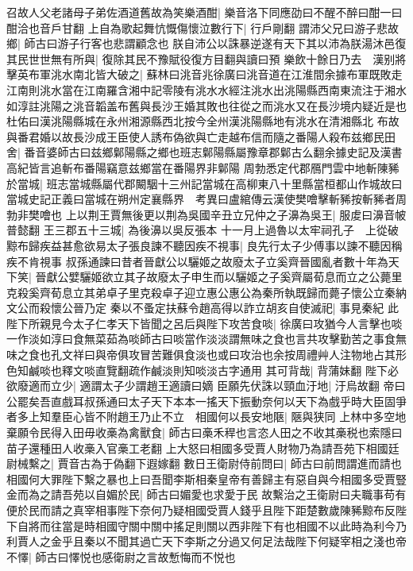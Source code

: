 召故人父老諸母子弟佐酒道舊故為笑樂酒酣|{
	樂音洛下同應劭曰不醒不醉曰酣一曰酣洽也音戶甘翻}
上自為歌起舞忼慨傷懷泣數行下|{
	行戶剛翻}
謂沛父兄曰游子悲故鄉|{
	師古曰游子行客也悲謂顧念也}
朕自沛公以誅暴逆遂有天下其以沛為朕湯沐邑復其民世世無有所與|{
	復除其民不豫賦役復方目翻與讀曰預}
樂飲十餘日乃去　漢别將擊英布軍洮水南北皆大破之|{
	蘇林曰洮音兆徐廣曰洮音道在江淮間余據布軍既敗走江南則洮水當在江南羅含湘中記零陵有洮水水經注洮水出洮陽縣西南東流注于湘水如淳註洮陽之洮音韜盖布舊與長沙王婚其敗也往從之而洮水又在長沙境内疑近是也杜佑曰漢洮陽縣城在永州湘源縣西北按今全州漢洮陽縣地有洮水在清湘縣北}
布故與番君婚以故長沙成王臣使人誘布偽欲與亡走越布信而隨之番陽人殺布兹鄉民田舍|{
	番音婆師古曰兹鄉鄡陽縣之鄉也班志鄡陽縣屬豫章郡鄡古么翻余據史記及漢書高紀皆言追斬布番陽竊意兹鄉當在番陽界非鄡陽}
周勃悉定代郡鴈門雲中地斬陳豨於當城|{
	班志當城縣屬代郡闞駰十三州記當城在高柳東八十里縣當桓都山作城故曰當城史記正義曰當城在朔州定襄縣界　考異曰盧綰傳云漢使樊噲擊斬豨按斬豨者周勃非樊噲也}
上以荆王賈無後更以荆為吳國辛丑立兄仲之子濞為吳王|{
	服䖍曰濞音帔普懿翻}
王三郡五十三城|{
	為後濞以吳反張本}
十一月上過魯以太牢祠孔子　上從破黥布歸疾益甚愈欲易太子張良諫不聽因疾不視事|{
	良先行太子少傅事以諫不聽因稱疾不肯視事}
叔孫通諫曰昔者晉獻公以驪姬之故廢太子立奚齊晉國亂者數十年為天下笑|{
	晉獻公嬖驪姬欲立其子故廢太子申生而以驪姬之子奚齊屬荀息而立之公薨里克殺奚齊荀息立其弟卓子里克殺卓子迎立惠公惠公為秦所執既歸而薨子懷公立秦納文公而殺懷公晉乃定}
秦以不蚤定扶蘇令趙高得以詐立胡亥自使滅祀|{
	事見秦紀}
此陛下所親見今太子仁孝天下皆聞之呂后與陛下攻苦食啖|{
	徐廣曰攻猶今人言擊也啖一作淡如淳曰食無菜茹為啖師古曰啖當作淡淡謂無味之食也言共攻擊勤苦之事食無味之食也孔文祥曰與帝俱攻冒苦難俱食淡也或曰攻治也余按周禮艸人注物地占其形色知鹹啖也釋文啖直覽翻疏作鹹淡則知啖淡古字通用}
其可背哉|{
	背蒲妹翻}
陛下必欲廢適而立少|{
	適謂太子少謂趙王適讀曰嫡}
臣願先伏誅以頸血汙地|{
	汙烏故翻}
帝曰公罷矣吾直戲耳叔孫通曰太子天下本本一搖天下振動奈何以天下為戲乎時大臣固爭者多上知羣臣心皆不附趙王乃止不立　相國何以長安地陿|{
	陿與狭同}
上林中多空地棄願令民得入田毋收槀為禽獸食|{
	師古曰槀禾稈也言恣人田之不收其槀税也索隱曰苗子還種田人收槀入官槀工老翻}
上大怒曰相國多受賈人財物乃為請吾苑下相國廷尉械繫之|{
	賈音古為于偽翻下遐嫁翻}
數日王衛尉侍前問曰|{
	師古曰前問謂進而請也}
相國何大罪陛下繫之暴也上曰吾聞李斯相秦皇帝有善歸主有惡自與今相國多受賈豎金而為之請吾苑以自媚於民|{
	師古曰媚愛也求愛于民}
故繫治之王衛尉曰夫職事苟有便於民而請之真宰相事陛下奈何乃疑相國受賈人錢乎且陛下距楚數歲陳豨黥布反陛下自將而往當是時相國守關中關中搖足則關以西非陛下有也相國不以此時為利今乃利賈人之金乎且秦以不聞其過亡天下李斯之分過又何足法哉陛下何疑宰相之淺也帝不懌|{
	師古曰懌悦也感衛尉之言故慙悔而不悦也}
